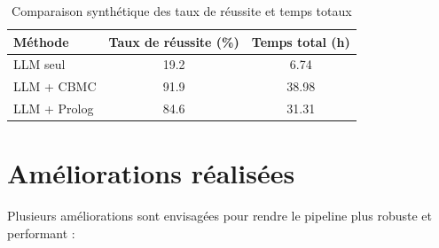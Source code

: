 \documentclass[a4paper,11pt]{article}
\begin{document}
\begin{table}[h!]
    \centering
    \caption{Comparaison synthétique des taux de réussite et temps totaux}
    \label{tab:comparison}
    \begin{tabular}{lcc}
        \toprule
        Méthode & Taux de réussite (\%) & Temps total (h) \\
        \midrule
        LLM seul & 19.2 & 6.74 \\
        LLM + CBMC & 91.9 & 38.98 \\
        LLM + Prolog & 84.6 & 31.31 \\
        \bottomrule
    \end{tabular}
\end{table}

\section{Améliorations réalisées}

Plusieurs améliorations sont envisagées pour rendre le pipeline plus robuste et performant :
\end{document}
